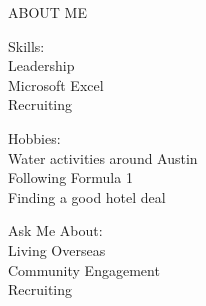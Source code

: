 \documentclass[10pt,A4]{article}
\newcommand{\vthemebox}[4]{
\begin{center}
\large{#1}\normalsize\\
    \vspace{4pt}
    {#2} \\
    \vspace{2pt}
    {#3} \\
    \vspace{2pt}
    {#4} \\
\end{center}
}
\newcommand{\mystrut}{\rule[-.3\baselineskip]{0pt}{\baselineskip}}
\begin{document}
\vspace{2pt}
\begin{center}
    \large\textcolor{sectcol}{ABOUT ME}\normalsize
\end{center}
\vspace{-4pt}

\begin{paracol}{3}
\vthemebox{Skills:}
    {Leadership}
    {Microsoft Excel}
    {Recruiting}
\switchcolumn
\vthemebox{Hobbies:}
    {Water activities around Austin}
    {Following Formula 1}
    {Finding a good hotel deal}
\switchcolumn
\vthemebox{Ask Me About:}
    {Living Overseas}
    {Community Engagement}
    {Recruiting}
\end{paracol}






%
%
%
%
%
%
\end{document}
